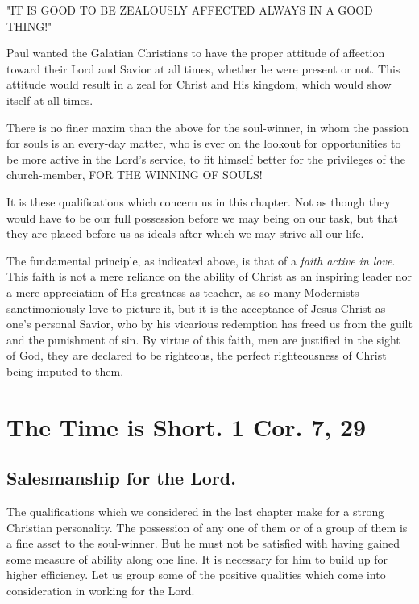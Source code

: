 \documentclass[
]{book}
\begin{document}
\begin{center} "IT IS GOOD TO BE ZEALOUSLY AFFECTED ALWAYS IN A GOOD THING!" \end{center}

Paul wanted the Galatian Christians to have the proper attitude of affection toward their Lord and Savior at all times, whether he were present or not. This attitude would result in a zeal for Christ and His kingdom, which would show itself at all times.

There is no finer maxim than the above for the soul-winner, in whom the passion for souls is an every-day matter, who is ever on the lookout for opportunities to be more active in the Lord's service, to fit himself better for the privileges of the church-member, FOR THE WINNING OF SOULS!

It is these qualifications which concern us in this chapter. Not as though they would have to be our full possession before we may being on our task, but that they are placed before us as ideals after which we may strive all our life.

The fundamental principle, as indicated above, is that of a \emph{faith active in love}. This faith is not a mere reliance on the ability of Christ as an inspiring leader nor a mere appreciation of His greatness as teacher, as so many Modernists sanctimoniously love to picture it, but it is the acceptance of Jesus Christ as one's personal Savior, who by his vicarious redemption has freed us from the guilt and the punishment of sin. By virtue of this faith, men are justified in the sight of God, they are declared to be righteous, the perfect righteousness of Christ being imputed to them.

\hypertarget{the-time-is-short.-1-cor.-7-29}{%
\chapter{The Time is Short. 1 Cor. 7, 29}\label{the-time-is-short.-1-cor.-7-29}}

\hypertarget{salesmanship-for-the-lord.}{%
\section*{Salesmanship for the Lord.}\label{salesmanship-for-the-lord.}}

The qualifications which we considered in the last chapter make for a strong Christian personality. The possession of any one of them or of a group of them is a fine asset to the soul-winner. But he must not be satisfied with having gained some measure of ability along one line. It is necessary for him to build up for higher efficiency. Let us group some of the positive qualities which come into consideration in working for the Lord.
\end{document}
